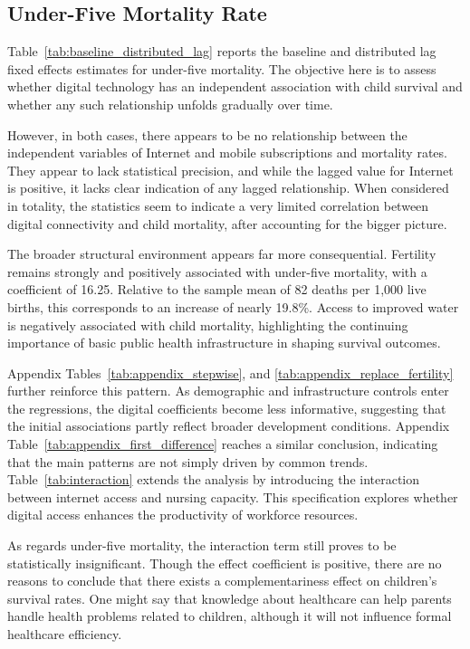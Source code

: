 \documentclass[12pt]{article}
\begin{document}
\subsection{Under-Five Mortality Rate}

Table~\ref{tab:baseline_distributed_lag} reports the baseline and distributed lag fixed effects estimates for under-five mortality. The objective here is to assess whether digital technology has an independent association with child survival and whether any such relationship unfolds gradually over time.

\medskip
However, in both cases, there appears to be no relationship between the independent variables of Internet and mobile subscriptions and mortality rates. They appear to lack statistical precision, and while the lagged value for Internet is positive, it lacks clear indication of any lagged relationship. When considered in totality, the statistics seem to indicate a very limited correlation between digital connectivity and child mortality, after accounting for the bigger picture.

\medskip
The broader structural environment appears far more consequential. Fertility remains strongly and positively associated with under-five mortality, with a coefficient of 16.25. Relative to the sample mean of 82 deaths per 1,000 live births, this corresponds to an increase of nearly 19.8\%. Access to improved water is negatively associated with child mortality, highlighting the continuing importance of basic public health infrastructure in shaping survival outcomes.

\medskip
Appendix Tables~\ref{tab:appendix_stepwise}, and \ref{tab:appendix_replace_fertility} further reinforce this pattern. As demographic and infrastructure controls enter the regressions, the digital coefficients become less informative, suggesting that the initial associations partly reflect broader development conditions. Appendix Table~\ref{tab:appendix_first_difference} reaches a similar conclusion, indicating that the main patterns are not simply driven by common trends. Table~\ref{tab:interaction} extends the analysis by introducing the interaction between internet access and nursing capacity. This specification explores whether digital access enhances the productivity of workforce resources.

\medskip
As regards under-five mortality, the interaction term still proves to be statistically insignificant. Though the effect coefficient is positive, there are no reasons to conclude that there exists a complementariness effect on children’s survival rates. One might say that knowledge about healthcare can help parents handle health problems related to children, although it will not influence formal healthcare efficiency.
\end{document}
